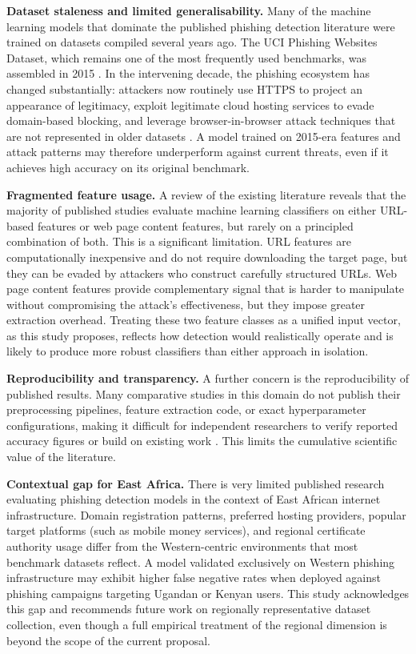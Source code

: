 \documentclass[11pt,letterpaper]{article}
\begin{document}
\textbf{Dataset staleness and limited generalisability.} Many of the machine learning models that dominate the published phishing detection literature were trained on datasets compiled several years ago. The UCI Phishing Websites Dataset, which remains one of the most frequently used benchmarks, was assembled in 2015 \cite{uci_phishing}. In the intervening decade, the phishing ecosystem has changed substantially: attackers now routinely use HTTPS to project an appearance of legitimacy, exploit legitimate cloud hosting services to evade domain-based blocking, and leverage browser-in-browser attack techniques that are not represented in older datasets \cite{han2022}. A model trained on 2015-era features and attack patterns may therefore underperform against current threats, even if it achieves high accuracy on its original benchmark.

\textbf{Fragmented feature usage.} A review of the existing literature reveals that the majority of published studies evaluate machine learning classifiers on either URL-based features or web page content features, but rarely on a principled combination of both. This is a significant limitation. URL features are computationally inexpensive and do not require downloading the target page, but they can be evaded by attackers who construct carefully structured URLs. Web page content features provide complementary signal that is harder to manipulate without compromising the attack's effectiveness, but they impose greater extraction overhead. Treating these two feature classes as a unified input vector, as this study proposes, reflects how detection would realistically operate and is likely to produce more robust classifiers than either approach in isolation.

\textbf{Reproducibility and transparency.} A further concern is the reproducibility of published results. Many comparative studies in this domain do not publish their preprocessing pipelines, feature extraction code, or exact hyperparameter configurations, making it difficult for independent researchers to verify reported accuracy figures or build on existing work \cite{gundersen2018}. This limits the cumulative scientific value of the literature.

\textbf{Contextual gap for East Africa.} There is very limited published research evaluating phishing detection models in the context of East African internet infrastructure. Domain registration patterns, preferred hosting providers, popular target platforms (such as mobile money services), and regional certificate authority usage differ from the Western-centric environments that most benchmark datasets reflect. A model validated exclusively on Western phishing infrastructure may exhibit higher false negative rates when deployed against phishing campaigns targeting Ugandan or Kenyan users. This study acknowledges this gap and recommends future work on regionally representative dataset collection, even though a full empirical treatment of the regional dimension is beyond the scope of the current proposal.
\end{document}
